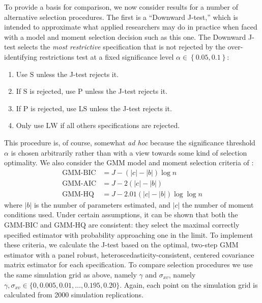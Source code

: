 To provide a basis for comparison, we now consider results for a number of alternative selection procedures. 
The first is a ``Downward J-test,'' which is intended to approximate what applied researchers may do in practice when faced with a model and moment selection decision such as this one.
The Downward J-test selects the \emph{most restrictive} specification that is not rejected by the over-identifying restrictions test at a fixed significance level $\alpha \in \left\{ 0.05, 0.1 \right\}$:
\begin{enumerate}
\item Use $\text{S}$ unless the J-test rejects it. 
\item If $\text{S}$ is rejected, use $\text{P}$ unless the J-test rejects it. 
\item If $\text{P}$ is rejected, use $\text{LS}$ unless the J-test rejects it. 
\item Only use $\text{LW}$ if all others specifications are rejected.
\end{enumerate}
This procedure is, of course, somewhat \emph{ad hoc} because the significance threshold $\alpha$ is chosen arbitrarily rather than with a view towards some kind of selection optimality. 
We also consider the GMM model and moment selection criteria of \cite{AndrewsLu}: 
	\begin{align*}
	 \mbox{GMM-BIC} &= J - (|c| - |b|) \log{n}\\
	 \mbox{GMM-AIC}&= J - 2(|c| - |b|)\\ 
	 \mbox{GMM-HQ} &= J - 2.01 (|c| - |b|)  \log{\log{n}}
	\end{align*}
where $|b|$ is the number of parameters estimated, and $|c|$ the number of moment conditions used. 
Under certain assumptions, it can be shown that both the GMM-BIC and GMM-HQ are consistent: they select the maximal correctly specified estimator with probability approaching one in the limit. 
To implement these criteria, we calculate the J-test based on the optimal, two-step GMM estimator with a panel robust, heteroscedasticity-consistent, centered covariance matrix estimator for each specification.
To compare selection procedures we use the same simulation grid as above, namely $\gamma$ and $\sigma_{xv}$, namely $\gamma, \sigma_{xv} \in \{0, 0.005, 0.01, \hdots, 0.195, 0.20\}$.  
Again, each point on the simulation grid is calculated from 2000 simulation replications. 


